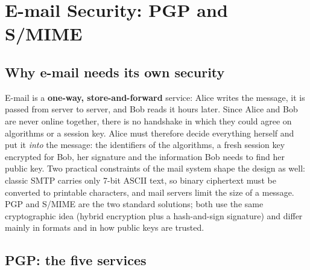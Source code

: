 \section{E-mail Security: PGP and S/MIME}\label{sec:email}

\subsection{Why e-mail needs its own security \new}

E-mail is a \textbf{one-way, store-and-forward} service: Alice writes the message, it is passed from server to server, and Bob reads it hours later. Since Alice and Bob are never online together, there is no handshake in which they could agree on algorithms or a session key. Alice must therefore decide everything herself and put it \emph{into} the message: the identifiers of the algorithms, a fresh session key encrypted for Bob, her signature and the information Bob needs to find her public key. Two practical constraints of the mail system shape the design as well: classic SMTP carries only 7-bit ASCII text, so binary ciphertext must be converted to printable characters, and mail servers limit the size of a message. PGP and S/MIME are the two standard solutions; both use the same cryptographic idea (hybrid encryption plus a hash-and-sign signature) and differ mainly in formats and in how public keys are trusted.

\subsection{PGP: the five services \hot\new}

